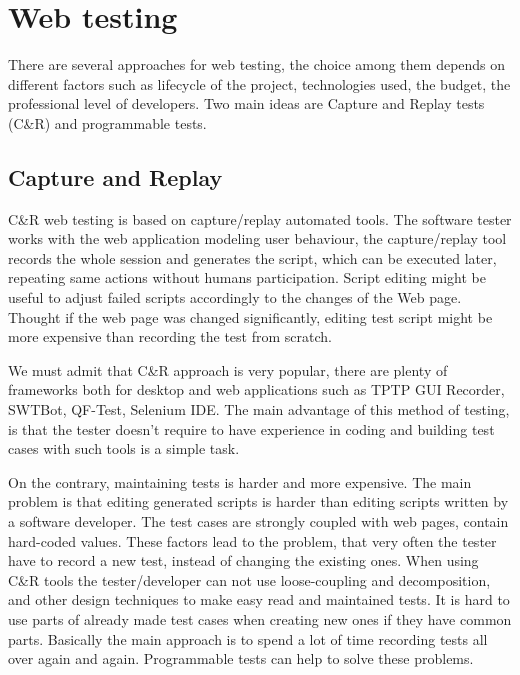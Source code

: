 	\chapter{Web testing}
	\label{ch:webtesting}

		There are several approaches for web testing, the choice among them depends on
		different factors such as lifecycle of the project, technologies used, the
		budget, the professional level of developers. Two main ideas are Capture and
		Replay tests (C\&R) and programmable tests.
		
		\section{Capture and Replay}
		\label{sec:captureReplay}
			C\&R web testing is based on capture/replay automated
			tools. \cite{CaptureReplay7} The software tester works with the web
			application modeling user behaviour, the capture/replay tool records the
			whole session and generates the script, which can be executed later,
			repeating same actions without humans participation. Script editing might
			 be useful to adjust failed scripts accordingly
			to the changes of the Web page. Thought if the web page was changed
			significantly, editing test script might be more expensive than recording the
			test from scratch. 
			
			We must admit that C\&R approach is very popular, there are plenty of
			frameworks both for desktop and web applications such as TPTP GUI Recorder, SWTBot, QF-Test,
			Selenium IDE.
			The main advantage of this method of testing, is that the tester doesn't
			require to have experience in coding and building test cases with such tools is a simple task. 
			
			On the contrary, maintaining tests is harder and more expensive.
			The main problem is that editing generated scripts is harder than editing
			scripts written by a software developer. The test cases are strongly coupled
			with web pages, contain hard-coded values. These factors lead to the
			problem, that very often the tester have to record a new test, instead of
			changing the existing ones. When using C\&R tools the tester/developer can
			not use loose-coupling and decomposition, and other design techniques to make
			easy read and maintained tests. It is hard to use parts of already made test
			cases when creating new ones if they have common parts. Basically the main
			approach is to spend a lot of time recording tests all over again and again.
			Programmable tests can help to solve these problems.
			
